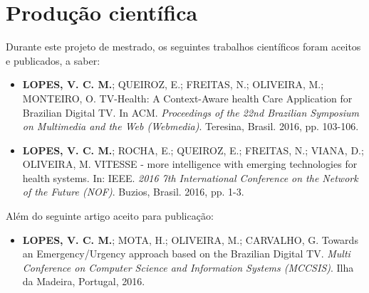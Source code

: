 

\section{Produção científica}\label{sec:producao}  

Durante este projeto de mestrado, os seguintes trabalhos científicos foram
aceitos e publicados, a saber:

\begin{itemize}
  \item \textbf{LOPES, V. C. M.}; QUEIROZ, E.; FREITAS, N.; OLIVEIRA, M.; MONTEIRO, O. TV-Health:
  A Context-Aware health Care Application for Brazilian Digital TV. In ACM.
  \textit{Proceedings of the 22nd Brazilian Symposium on Multimedia and the Web (Webmedia)}. 
  Teresina, Brasil. 2016, pp. 103-106.

  \item \textbf{LOPES, V. C. M.}; ROCHA, E.; QUEIROZ, E.; FREITAS, N.; VIANA, D.; OLIVEIRA, M. VITESSE 
  - more intelligence with emerging technologies for health systems. In: IEEE. 
  \textit{2016 7th International Conference on the Network of the Future (NOF)}. Buzios, Brasil. 2016, pp. 1-3.
\end{itemize}

Além do seguinte artigo aceito para publicação:

\begin{itemize}
  \item \textbf{LOPES, V. C. M.}; MOTA, H.; OLIVEIRA, M.; CARVALHO, G. Towards an Emergency/Urgency
    approach based on the Brazilian Digital TV. \textit{Multi Conference on Computer Science 
    and Information Systems (MCCSIS)}. Ilha da Madeira, Portugal, 2016.
\end{itemize}

